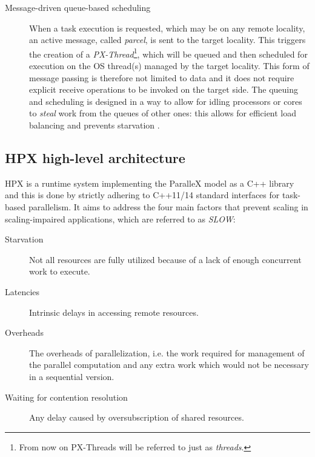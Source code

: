 \begin{description}
	\item [Message-driven queue-based scheduling] When a task execution is requested, which may be on any remote locality, an active message, called \emph{parcel}, is sent to the target locality. This triggers the creation of a \emph{PX-Thread}\footnote{From now on PX-Threads will be referred to just as \emph{threads}.}, which will be queued and then scheduled for execution on the OS thread(s) managed by the target locality. This form of message passing is therefore not limited to data and it does not require explicit receive operations to be invoked on the target side. The queuing and scheduling is designed in a way to allow for idling processors or cores to \emph{steal} work from the queues of other ones: this allows for efficient load balancing and prevents starvation
	.
\end{description}


\subsection{HPX high-level architecture}
HPX is a runtime system implementing the ParalleX model as a C++ library and this is done by strictly adhering to C++11/14 standard interfaces for task-based parallelism.
It aims to address the four main factors that prevent scaling in scaling-impaired applications, which are referred to as \emph{SLOW}\cite{kaiser2014hpx}:
\begin{description}
	\item [Starvation] Not all resources are fully utilized because of a lack of enough concurrent work to execute.
	\item [Latencies] Intrinsic delays in accessing remote resources.
	\item [Overheads] The overheads of parallelization, i.e. the work required for management of the parallel computation and any extra work which would not be necessary in a sequential version.
	\item [Waiting for contention resolution] Any delay caused by oversubscription of shared resources.
\end{description}

